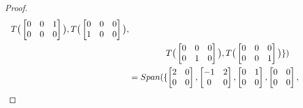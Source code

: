 \documentclass[12pt]{article}
\newenvironment{exercise}[2][Exercise]{\begin{trivlist}
\item[\hskip \labelsep{\bfseries #1}\hskip \labelsep{\bfseries #2.}]}{\end{trivlist}}
\begin{document}
\begin{exercise}{2.1.4}
\begin{proof}
\begin{align*}
                    T\big(\begin{bmatrix}
                        0 & 0 & 1 \\
                        0 & 0 & 0 \\
                    \end{bmatrix}\big),
                    T\big(\begin{bmatrix}
                        0 & 0 & 0 \\
                        1 & 0 & 0 \\
                    \end{bmatrix}\big), \\
            &       \hspace{10ex} T\big(\begin{bmatrix}
                        0 & 0 & 0 \\
                        0 & 1 & 0 \\
                    \end{bmatrix}\big),
                    T\big(\begin{bmatrix}
                        0 & 0 & 0 \\
                        0 & 0 & 1 \\
                    \end{bmatrix}\big)
                \}) \\
            &= Span(\{
                    \begin{bmatrix}
                        2 & 0 \\
                        0 & 0 \\
                    \end{bmatrix},
                    \begin{bmatrix}
                        -1 & 2 \\
                        0 & 0 \\
                    \end{bmatrix},
                    \begin{bmatrix}
                        0 & 1 \\
                        0 & 0 \\
                    \end{bmatrix},
                    \begin{bmatrix}
                        0 & 0 \\
                        0 & 0 \\
                    \end{bmatrix},

\end{align*}
\end{proof}
\end{exercise}
\end{document}
